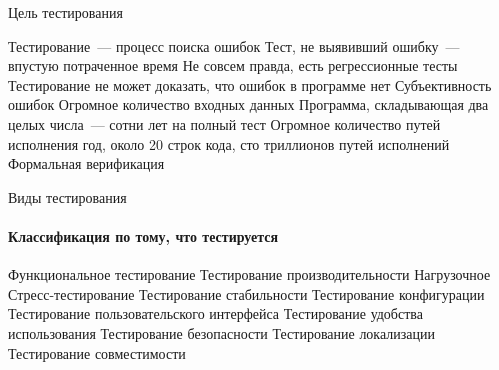\documentclass{../../slides-style}
\begin{document}
    \begin{frame}{Цель тестирования}
        \begin{outline}
            \1 Тестирование~--- процесс поиска ошибок
                \2 Тест, не выявивший ошибку~--- впустую потраченное время
                    \3 Не совсем правда, есть регрессионные тесты
            \1 Тестирование не может доказать, что ошибок в программе нет
                \2 Субъективность ошибок
                \2 Огромное количество входных данных
                    \3 Программа, складывающая два целых числа~--- сотни лет на полный тест
                \2 Огромное количество путей исполнения
                     год, около 20 строк кода, сто триллионов путей исполнений
            \1 Формальная верификация
        \end{outline}
    \end{frame}

    \begin{frame}{Виды тестирования}
        \framesubtitle{Классификация по тому, что тестируется}
        \begin{outline}
            \1 Функциональное тестирование
            \1 Тестирование производительности
                \2 Нагрузочное
                \2 Стресс-тестирование
                \2 Тестирование стабильности
                \2 Тестирование конфигурации
            \1 Тестирование пользовательского интерфейса
            \1 Тестирование удобства использования
            \1 Тестирование безопасности
            \1 Тестирование локализации
            \1 Тестирование совместимости
        \end{outline}
    \end{frame}
\end{document}
